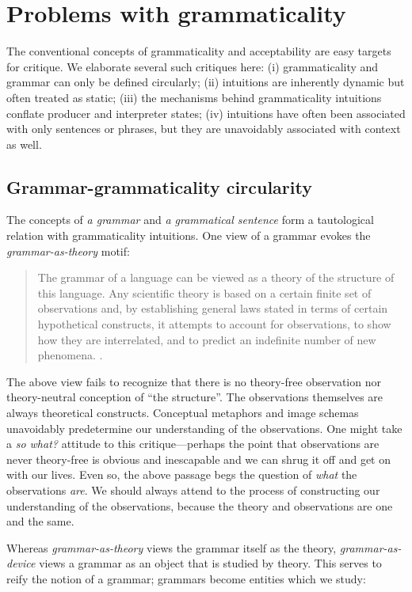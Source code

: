 \section{Problems with grammaticality}

The conventional concepts of grammaticality and acceptability are easy targets for critique. We elaborate several such critiques here: (i) grammaticality and grammar can only be defined circularly; (ii) intuitions are inherently dynamic but often treated as static; (iii) the mechanisms behind grammaticality intuitions conflate producer and interpreter states; (iv) intuitions have often been associated with only sentences or phrases, but they are unavoidably associated with context as well.

\subsection{Grammar-grammaticality circularity}

The concepts of \textit{a grammar} and \textit{a grammatical sentence} form a tautological relation with grammaticality intuitions. One view of a grammar evokes the \textit{grammar-as-theory} motif:

\begin{quote}
The grammar of a language can be viewed as a theory of the structure of this language. Any scientific theory is based on a certain finite set of observations and, by establishing general laws stated in terms of certain hypothetical constructs, it attempts to account for observations, to show how they are interrelated, and to predict an indefinite number of new phenomena. \citep[113]{Chomsky1956}.
\end{quote}

  The above view fails to recognize that there is no theory-free observation nor theory-neutral conception of “the structure”. The observations themselves are always theoretical constructs. Conceptual metaphors and image schemas unavoidably predetermine our understanding of the observations. One might take a \textit{so what?} attitude to this critique—perhaps the point that observations are never theory-free is obvious and inescapable and we can shrug it off and get on with our lives. Even so, the above passage begs the question of \textit{what} the observations \textit{are}. We should always attend to the process of constructing our understanding of the observations, because the theory and observations are one and the same.

  Whereas \textit{grammar-as-theory} views the grammar itself as the theory, \textit{grammar-as-device} views a grammar as an object that is studied by theory. This serves to reify the notion of a grammar; grammars become entities which we study:

